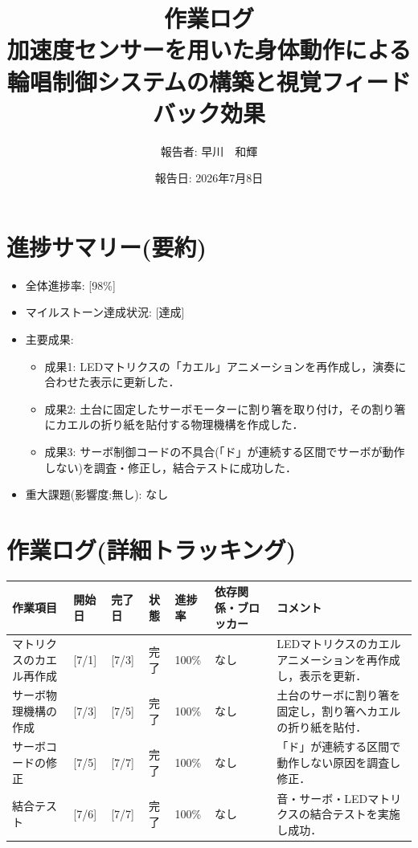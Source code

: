 \documentclass[uplatex,dvipdfmx]{jlreq}
\title{作業ログ\\ \large 加速度センサーを用いた身体動作による輪唱制御システムの構築と視覚フィードバック効果}
\author{報告者: 早川　和輝}
\date{報告日: 2026年7月8日}
\begin{document}
\maketitle

\section{進捗サマリー(要約)}
\begin{itemize}
    \item 全体進捗率: [98\%]
    \item マイルストーン達成状況: [達成]
    \item 主要成果:
    \begin{itemize}
        \item 成果1: LEDマトリクスの「カエル」アニメーションを再作成し，演奏に合わせた表示に更新した．
        \item 成果2: 土台に固定したサーボモーターに割り箸を取り付け，その割り箸にカエルの折り紙を貼付する物理機構を作成した．
        \item 成果3: サーボ制御コードの不具合(「ド」が連続する区間でサーボが動作しない)を調査・修正し，結合テストに成功した．
    \end{itemize}
    \item 重大課題(影響度:無し): なし
\end{itemize}

\section{作業ログ(詳細トラッキング)}
\begin{table}[H]
    \centering
    \small
    \begin{tabular}{lp{1.5cm}p{1.5cm}llp{2.5cm}p{3cm}}
        \toprule
        作業項目 & 開始日 & 完了日 & 状態 & 進捗率 & 依存関係・ブロッカー & コメント \\
        \midrule
        マトリクスのカエル再作成 & [7/1] & [7/3] & 完了 & 100\% & なし & LEDマトリクスのカエルアニメーションを再作成し，表示を更新． \\
        サーボ物理機構の作成 & [7/3] & [7/5] & 完了 & 100\% & なし & 土台のサーボに割り箸を固定し，割り箸へカエルの折り紙を貼付． \\
        サーボコードの修正 & [7/5] & [7/7] & 完了 & 100\% & なし & 「ド」が連続する区間で動作しない原因を調査し修正． \\
        結合テスト & [7/6] & [7/7] & 完了 & 100\% & なし & 音・サーボ・LEDマトリクスの結合テストを実施し成功． \\
        \bottomrule
    \end{tabular}
\end{table}
\end{document}
